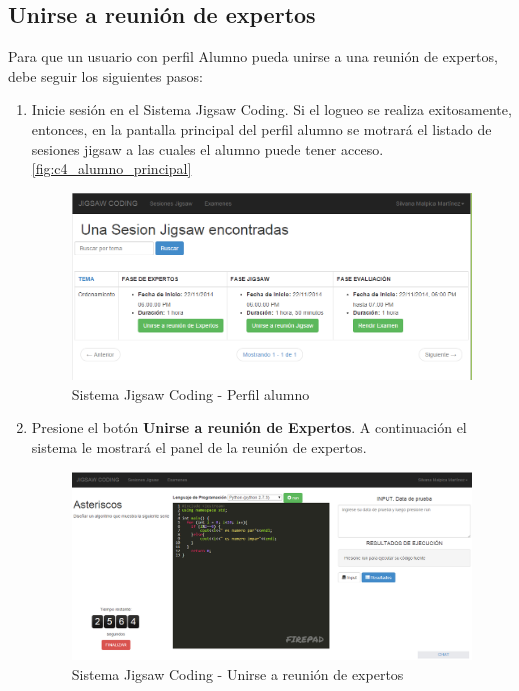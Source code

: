 \subsection{Unirse a reunión de expertos}
Para que un usuario con perfil Alumno pueda unirse a una reunión de expertos, debe seguir los siguientes pasos:

\begin{enumerate}
	\item Inicie sesión en el Sistema Jigsaw Coding. Si el logueo se realiza exitosamente, entonces, en la pantalla principal del perfil alumno se motrará el listado de sesiones jigsaw a las cuales el alumno puede tener acceso.\autoref{fig:c4_alumno_principal}
	
	\begin{figure}[h!]
		\centering
		\caption{Sistema Jigsaw Coding - Perfil alumno}
		\label{fig:c4_alumno_principal}
		\includegraphics[scale=0.5]{figuras/usodelsistema/alumno/principal}
	\end{figure}
	
	\item Presione el botón \textbf{Unirse a reunión de Expertos}. A continuación el sistema le mostrará el panel de la reunión de expertos. 
	
	\begin{figure}[h!]
		\centering
		\caption{Sistema Jigsaw Coding - Unirse a reunión de expertos}
		\label{fig:c4_reunion_expertos}
		\includegraphics[scale=0.4]{figuras/usodelsistema/alumno/reunion_expertos}
	\end{figure}
	

\end{enumerate}
